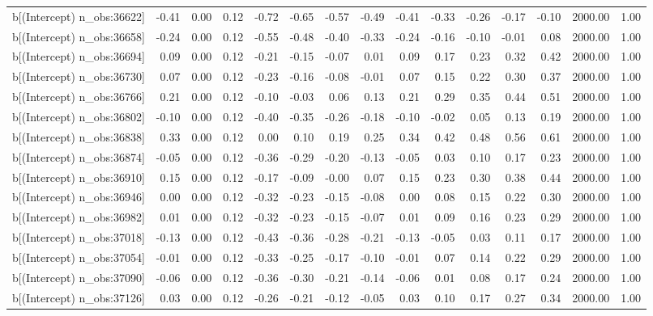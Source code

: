 \begin{table}[ht]
\begin{tabular}{rrrrrrrrrrrrrrr}
  b[(Intercept) n\_obs:36622] & -0.41 & 0.00 & 0.12 & -0.72 & -0.65 & -0.57 & -0.49 & -0.41 & -0.33 & -0.26 & -0.17 & -0.10 & 2000.00 & 1.00 \\ 
  b[(Intercept) n\_obs:36658] & -0.24 & 0.00 & 0.12 & -0.55 & -0.48 & -0.40 & -0.33 & -0.24 & -0.16 & -0.10 & -0.01 & 0.08 & 2000.00 & 1.00 \\ 
  b[(Intercept) n\_obs:36694] & 0.09 & 0.00 & 0.12 & -0.21 & -0.15 & -0.07 & 0.01 & 0.09 & 0.17 & 0.23 & 0.32 & 0.42 & 2000.00 & 1.00 \\ 
  b[(Intercept) n\_obs:36730] & 0.07 & 0.00 & 0.12 & -0.23 & -0.16 & -0.08 & -0.01 & 0.07 & 0.15 & 0.22 & 0.30 & 0.37 & 2000.00 & 1.00 \\ 
  b[(Intercept) n\_obs:36766] & 0.21 & 0.00 & 0.12 & -0.10 & -0.03 & 0.06 & 0.13 & 0.21 & 0.29 & 0.35 & 0.44 & 0.51 & 2000.00 & 1.00 \\ 
  b[(Intercept) n\_obs:36802] & -0.10 & 0.00 & 0.12 & -0.40 & -0.35 & -0.26 & -0.18 & -0.10 & -0.02 & 0.05 & 0.13 & 0.19 & 2000.00 & 1.00 \\ 
  b[(Intercept) n\_obs:36838] & 0.33 & 0.00 & 0.12 & 0.00 & 0.10 & 0.19 & 0.25 & 0.34 & 0.42 & 0.48 & 0.56 & 0.61 & 2000.00 & 1.00 \\ 
  b[(Intercept) n\_obs:36874] & -0.05 & 0.00 & 0.12 & -0.36 & -0.29 & -0.20 & -0.13 & -0.05 & 0.03 & 0.10 & 0.17 & 0.23 & 2000.00 & 1.00 \\ 
  b[(Intercept) n\_obs:36910] & 0.15 & 0.00 & 0.12 & -0.17 & -0.09 & -0.00 & 0.07 & 0.15 & 0.23 & 0.30 & 0.38 & 0.44 & 2000.00 & 1.00 \\ 
  b[(Intercept) n\_obs:36946] & 0.00 & 0.00 & 0.12 & -0.32 & -0.23 & -0.15 & -0.08 & 0.00 & 0.08 & 0.15 & 0.22 & 0.30 & 2000.00 & 1.00 \\ 
  b[(Intercept) n\_obs:36982] & 0.01 & 0.00 & 0.12 & -0.32 & -0.23 & -0.15 & -0.07 & 0.01 & 0.09 & 0.16 & 0.23 & 0.29 & 2000.00 & 1.00 \\ 
  b[(Intercept) n\_obs:37018] & -0.13 & 0.00 & 0.12 & -0.43 & -0.36 & -0.28 & -0.21 & -0.13 & -0.05 & 0.03 & 0.11 & 0.17 & 2000.00 & 1.00 \\ 
  b[(Intercept) n\_obs:37054] & -0.01 & 0.00 & 0.12 & -0.33 & -0.25 & -0.17 & -0.10 & -0.01 & 0.07 & 0.14 & 0.22 & 0.29 & 2000.00 & 1.00 \\ 
  b[(Intercept) n\_obs:37090] & -0.06 & 0.00 & 0.12 & -0.36 & -0.30 & -0.21 & -0.14 & -0.06 & 0.01 & 0.08 & 0.17 & 0.24 & 2000.00 & 1.00 \\ 
  b[(Intercept) n\_obs:37126] & 0.03 & 0.00 & 0.12 & -0.26 & -0.21 & -0.12 & -0.05 & 0.03 & 0.10 & 0.17 & 0.27 & 0.34 & 2000.00 & 1.00 \\ 

\end{tabular}
\end{table}
